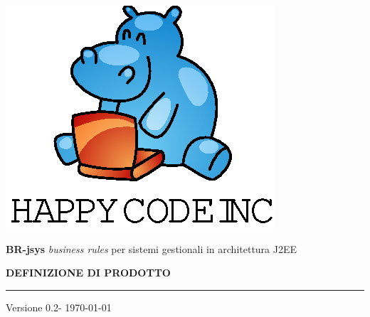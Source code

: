 \documentclass[11pt,titlepage,a4paper]{report}
\begin{document}
\newcommand{\lv}{0.2} %



\begin{titlepage}
\begin{center}
\vspace*{0.5in}
\includegraphics{logo.eps}
\vspace*{0.2in}

{\Large \textbf{BR-jsys}}
{\Large \emph{business rules} per sistemi gestionali in architettura J2EE } 
\vspace{2in}

\LARGE \textbf {DEFINIZIONE DI PRODOTTO}
\par\rule{10cm}{0.4pt} \par {\large Versione \lv - \today}


\end{center}
\end{titlepage}
\vspace*{0.5in}
\end{document}
